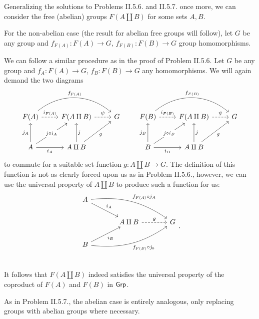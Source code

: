 \begin{solution}
	Generalizing the solutions to Problems II.5.6. and II.5.7. once more, we can consider the free (abelian) groups $F(A \amalg B)$ for some sets $A, B$.
	
	For the non-abelian case (the result for abelian free groups will follow), let $G$ be any group and $f_{F(A)}: F(A) \to G$, $f_{F(B)}: F(B) \to G$ group homomorphisms.
	
	We can follow a similar procedure as in the proof of Problem II.5.6. Let $G$ be any group and $f_A: F(A) \to G$, $f_B: F(B) \to G$ any homomorphisms. We will again demand the two diagrams
	\begin{equation*}
		\begin{tikzcd}[row sep=large]
			F(A)
			\arrow[r, dashrightarrow, "i_{F(A)}"]
			\arrow[rr, bend left=40, "f_{F(A)}"]
			& F(A \amalg B)
			\arrow[r, dashrightarrow, "\psi"]
			& G \\
			A
			\arrow[u, "j_A"]
			\arrow[r, "i_A"']
			\arrow[ur, "j \circ i_A" description] &
			A \amalg B
			\arrow[u, "j"']
			\arrow[ur, "g"']
			&
		\end{tikzcd}\qquad
		\begin{tikzcd}[row sep=large]
			F(B)
			\arrow[r, dashrightarrow, "i_{F(B)}"]
			\arrow[rr, bend left=40, "f_{F(B)}"]
			& F(A \amalg B)
			\arrow[r, dashrightarrow, "\psi"]
			& G \\
			B
			\arrow[u, "j_B"]
			\arrow[r, "i_B"']
			\arrow[ur, "j \circ i_B" description] &
			A \amalg B
			\arrow[u, "j"']
			\arrow[ur, "g"']
			&
		\end{tikzcd}
	\end{equation*}
	to commute for a suitable set-function $g: A \amalg B \to G$. The definition of this function is not as clearly forced upon us as in Problem II.5.6., however, we can use the universal property of $A \amalg B$ to produce such a function for us:
	\begin{equation*}
		\begin{tikzcd}[column sep=large]
			A
			\arrow[dr, "i_A"]
			\arrow[drr, bend left=20, "f_{F(A)} \circ j_A"]
			& & \\
			& A \amalg B
			\arrow[r, dashrightarrow, "g"]
			& G \\
			B
			\arrow[ur, "i_B"']
			\arrow[urr, bend right=20, "f_{F(B)} \circ j_b"']
			& & \\
		\end{tikzcd} \text{.}
	\end{equation*}
	
	It follows that $F(A \amalg B)$ indeed satisfies the universal property of the coproduct of $F(A)$ and $F(B)$ in $\mathsf{Grp}$.
	
	As in Problem II.5.7., the abelian case is entirely analogous, only replacing groups with abelian groups where necessary.
\end{solution}

